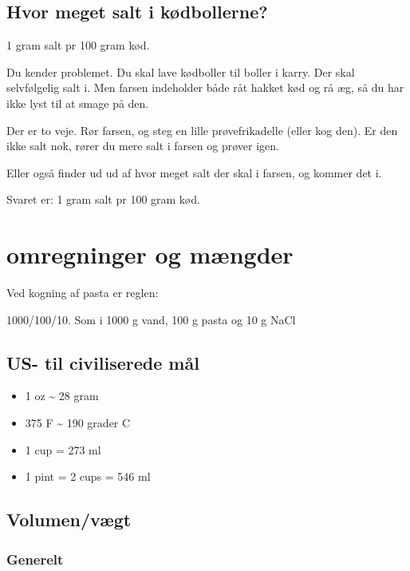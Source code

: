 \documentclass[
]{book}
\providecommand{\tightlist}{%
  \setlength{\itemsep}{0pt}\setlength{\parskip}{0pt}}
\begin{document}
\section{Hvor meget salt i kødbollerne?}\label{hvor-meget-salt-i-kuxf8dbollerne}

1 gram salt pr 100 gram kød.

Du kender problemet. Du skal lave kødboller til boller i karry. Der skal selvfølgelig salt i. Men farsen indeholder både råt hakket kød og rå æg, så du har ikke lyst til at smage på den.

Der er to veje. Rør farsen, og steg en lille prøvefrikadelle (eller kog den). Er den ikke salt nok, rører du mere salt i farsen og prøver igen.

Eller også finder ud ud af hvor meget salt der skal i farsen, og kommer det i.

Svaret er: 1 gram salt pr 100 gram kød.

\chapter{omregninger og mængder}\label{omregninger-og-muxe6ngder}

Ved kogning af pasta er reglen:

1000/100/10. Som i 1000 g vand, 100 g pasta og 10 g NaCl

\section{US- til civiliserede mål}\label{us--til-civiliserede-muxe5l}

\begin{itemize}
\tightlist
\item
  1 oz \textasciitilde{} 28 gram
\item
  375 F \textasciitilde{} 190 grader C
\item
  1 cup = 273 ml
\item
  1 pint = 2 cups = 546 ml
\end{itemize}

\section{Volumen/vægt}\label{volumenvuxe6gt}

\subsection{Generelt}\label{generelt}
\end{document}
